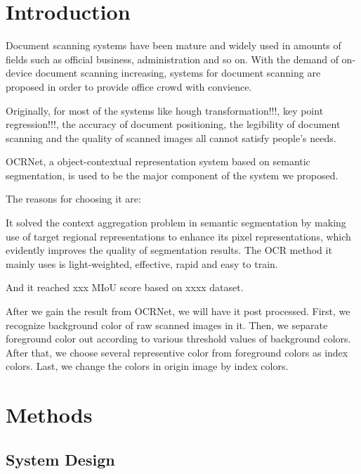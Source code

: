 \documentclass[10pt, conference, compsocconf]{IEEEtran}
\begin{document}
	\section{Introduction}
	

	Document scanning systems have been mature and widely used in amounts of fields such as official business, administration and so on. 
	With the demand of on-device document scanning increasing, systems for document scanning are proposed in order to provide office crowd with convience. 


	Originally, for most of the systems like hough transformation!!!, key point regression!!!, the accuracy of document positioning, the legibility of document scanning and the quality of scanned images all cannot satisfy people's needs. 


	OCRNet, a object-contextual representation system based on semantic segmentation, is used to be the major component of the system we proposed. 


	The reasons for choosing it are: 
	
	It solved the context aggregation problem in semantic segmentation by making use of target regional representations to enhance its pixel representations, which evidently improves the quality of segmentation results. 
	The OCR method it mainly uses is light-weighted, effective, rapid and easy to train.  


	And it reached xxx MIoU score based on xxxx dataset. 


	After we gain the result from OCRNet, we will have it post processed. 
	First, we recognize background color of raw scanned images in it. 
	Then, we separate foreground color out according to various threshold values of background colors. 
	After that, we choose several representive color from foreground colors as index colors. 
	Last, we change the colors in origin image by index colors. 
	
	\section{Methods}
		\subsection{System Design}
\end{document}
